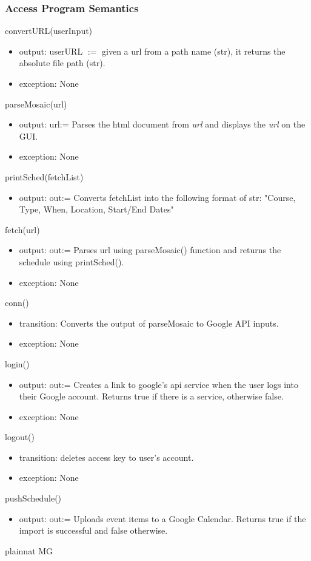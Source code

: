 \documentclass[12pt, titlepage]{article}
\begin{document}
\subsubsection{Access Program Semantics}
convertURL(userInput) 
\begin{itemize}
    \item output: userURL $:=$ given a url from a path name (str), it returns the absolute file path (str).
    \item exception: None
\end{itemize}
parseMosaic(url)
\begin{itemize}
    \item output: url:= Parses the html document from \emph{url} and displays the \emph{url} on the GUI.
    \item exception: None
\end{itemize}
printSched(fetchList)
\begin{itemize}
    \item output: out:= Converts fetchList into the following format of str: "Course, Type, When, Location, Start/End Dates"
\end{itemize}
fetch(url)
\begin{itemize}
    \item output: out:= Parses url using parseMosaic() function and returns the schedule using printSched().
    \item exception: None
\end{itemize}
conn()
\begin{itemize}
    \item transition: Converts the output of parseMosaic to Google API inputs.
    \item exception: None
\end{itemize}
login()
\begin{itemize}
    \item output: out:= Creates a link to google's api service when the user logs into their Google account. Returns true if there is a service, otherwise false.
    \item exception: None
\end{itemize}
logout()
\begin{itemize}
    \item transition: deletes access key to user's account. 
    \item exception: None
\end{itemize}
pushSchedule()
\begin{itemize}
    \item output: out:= Uploads event items to a Google Calendar. Returns true if the import is successful and false otherwise.
\end{itemize}




 {plainnat}
 {MG}
\end{document}
